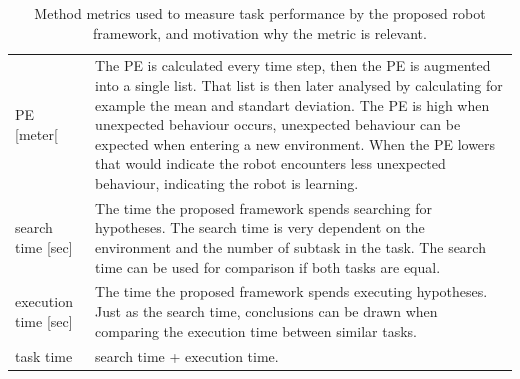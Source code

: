 \noindent
\begin{table}[H]
\centering
\begin{tabular}%
  {>{\raggedright\arraybackslash}p{}%
   >{\raggedright\arraybackslash}p{}}
\acl{PE} [meter[ & The \ac{PE} is calculated every time step, then the \ac{PE} is augmented into a single list. That list is then later analysed by calculating for example the mean and standart deviation. The \ac{PE} is high when unexpected behaviour occurs, unexpected behaviour can be expected when entering a new environment. When the \ac{PE} lowers that would indicate the robot encounters less unexpected behaviour, indicating the robot is learning.\\
search time [sec]& The time the proposed framework spends searching for hypotheses. The search time is very dependent on the environment and the number of subtask in the task. The search time can be used for comparison if both tasks are equal.\\ 
execution time [sec] & The time the proposed framework spends executing hypotheses. Just as the search time, conclusions can be drawn when comparing the execution time between similar tasks.\\ 
task time & search time + execution time. \\
\end{tabular}
\caption{Method metrics used to measure task performance by the proposed robot framework, and motivation why the metric is relevant.}\label{table:proposed_method_metrics}
\end{table}

